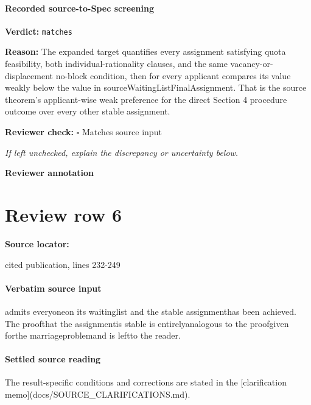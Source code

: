 \documentclass[10pt]{article}
\newcommand{\reviewerbox}{%
  \par\noindent\fbox{\parbox{0.96\linewidth}{\rule{0pt}{0.38in}}}\par
}
\newcommand{\reviewmatch}[1]{%
  \par\noindent\textbf{Reviewer check:} $\square$\; #1\par
  \noindent\emph{If left unchecked, explain the discrepancy or uncertainty below.}\par
}
\begin{document}
\paragraph{Recorded source-to-Spec screening}
\textbf{Verdict:} \texttt{matches}
\\
{\raggedright
\textbf{Reason:} The expanded target quantifies every assignment satisfying quota feasibility, both individual-\allowbreak{}rationality clauses, and the same vacancy-\allowbreak{}or-\allowbreak{}displacement no-\allowbreak{}block condition, then for every applicant compares its value weakly below the value in sourceWaitingListFinalAssignment.\allowbreak{} That is the source theorem's applicant-\allowbreak{}wise weak preference for the direct Section 4 procedure outcome over every other stable assignment.\allowbreak{}
\par}
\reviewmatch{Matches source input}
\noindent\textbf{Reviewer annotation}\par
\reviewerbox
\clearpage
\hypertarget{source-claim-defab06662f25c9e}{}
\section*{Review row 6}
\textbf{Source locator:} {\footnotesize\raggedright cited publication, lines 232-\allowbreak{}249\par}
\paragraph{Verbatim source input}
\begin{ReviewVerbatim}
admits everyoneon its waitinglist and the stable assignmenthas been achieved.
The proofthat the assignmentis stable is entirelyanalogous to the proofgiven
forthe marriageproblemand is leftto the reader.
\end{ReviewVerbatim}

\paragraph{Settled source reading}
The result-\allowbreak{}specific conditions and corrections are stated in the [clarification memo](docs/\allowbreak{}SOURCE\_\allowbreak{}CLARIFICATIONS.\allowbreak{}md).\allowbreak{}
\end{document}
